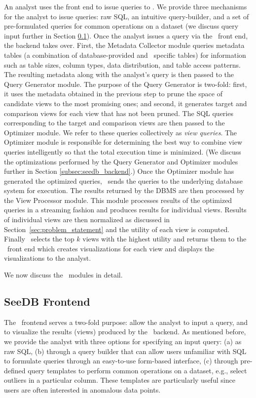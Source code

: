 An analyst uses the front end to issue queries to \SeeDB. We provide three
mechanisms for the analyst to issue queries: raw SQL, an intuitive
query-builder, and a set of pre-formulated queries for common operations on a
dataset (we discuss query input further in Section \ref{subsec:seedb_frontend}).
Once the analyst issues a query via the \SeeDB\ front end, the backend
takes over.
First, the Metadata Collector module queries metadata tables (a combination of
database-provided and \SeeDB\ specific tables) for information such as table
sizes, column types, data distribution, and table access patterns.
The resulting metadata along with the analyst's query is then passed to the
Query Generator module. The purpose of the Query Generator is two-fold:
first, it uses the metadata obtained in the previous step to prune the space of
candidate views to the most promising ones; and second, it generates target and
comparison views for each view that has not been pruned.
The SQL queries corresponding to the target and comparison views are then passed
to the Optimizer module. We refer to these queries collectively as {\it view
queries}.
The Optimizer module is responsible for determining the best way to combine
view queries intelligently so that the total execution time is
minimized. 
(We discuss the optimizations performed by the Query Generator and
Optimizer modules further in Section \ref{subsec:seedb_backend}.) Once the
Optimizer module has generated the optimized queries, \SeeDB\ sends the
queries to the underlying database system for execution. The results returned by
the DBMS are then processed by the View Processor module. This module processes
results of the optimized queries in a streaming fashion and produces results for
individual views. Results of individual views are then normalized as discussed
in Section~\ref{sec:problem_statement} and the utility of each view is computed.
Finally \SeeDB\ selects the top $k$ views with the highest utility and returns them to the
\SeeDB\ front end which creates visualizations for each view and displays
the visualizations to the analyst.

We now discuss the \SeeDB\ modules in detail.

\subsection{SeeDB Frontend}
\label{subsec:seedb_frontend}

The \SeeDB\ frontend serves a two-fold purpose: allow the analyst to input a
query, and to visualize the results (views) produced by the \SeeDB\ backend.
As mentioned before, we provide the analyst with three options for specifying an
input query: (a) as raw SQL, (b) through a query builder that can allow users
unfamiliar with SQL to formulate queries through an easy-to-use form-based
interface, (c) through pre-defined query templates to perform common operations
on a dataset, e.g., select outliers in a particular column. These
templates are particularly useful since users are often interested in anomalous
data points.

